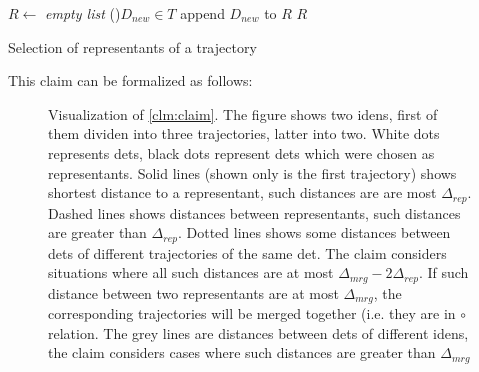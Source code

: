 

\begin{algorithm}

 
 \BlankLine
 $R \leftarrow$ \emph{empty list}\;
 \For(){$D_{new} \in T$}{
  append $D_{new}$ to $R$\;
 }
 \Return $R$
 \caption{Selection of representants of a trajectory}
 \label{alg:representants}
\end{algorithm}


This claim can be formalized as follows:

\begin{figure}
    \centering
    \def\svgwidth{\columnwidth}
    
    \caption[Visualization of \autoref{clm:claim}]{Visualization of  \autoref{clm:claim}. The figure shows two \glspl{iden}, first of them dividen into three trajectories, latter into two. White dots represents \glspl{det}, black dots represent \glspl{det} which were chosen as representants. Solid lines (shown only is the first trajectory) shows shortest distance to a representant, such distances are are most $\Delta_{rep}$. Dashed lines shows distances between representants, such distances are greater than $\Delta_{rep}$. Dotted lines shows some distances between \glspl{det} of different trajectories of the same \gls{det}. The claim considers situations where all such distances are at most $\Delta_{mrg} - 2\Delta_{rep}$. If such distance between two representants are at most $\Delta_{mrg}$, the corresponding trajectories will be merged together (i.e. they are in $\circ$ relation. The grey lines are distances between \glspl{det} of different \glspl{iden}, the claim considers cases where such distances are greater than $\Delta_{mrg}$}
    \label{fig:claim}
\end{figure}

